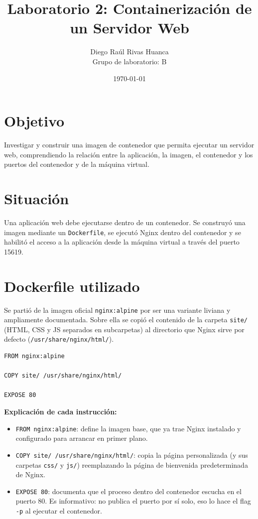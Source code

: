 \documentclass[11pt,a4paper]{article}
\title{Laboratorio 2: Containerización de un Servidor Web}
\author{Diego Raúl Rivas Huanca \\ Grupo de laboratorio: B} \\
\date{\today}
\begin{document}
\maketitle

\section{Objetivo}
Investigar y construir una imagen de contenedor que permita ejecutar un
servidor web, comprendiendo la relación entre la aplicación, la
imagen, el contenedor y los puertos del contenedor y de la máquina
virtual.

\section{Situación}
Una aplicación web debe ejecutarse dentro de un contenedor. Se
construyó una imagen mediante un \texttt{Dockerfile}, se ejecutó Nginx
dentro del contenedor y se habilitó el acceso a la aplicación desde la
máquina virtual a través del puerto 15619.

\section{Dockerfile utilizado}
Se partió de la imagen oficial \texttt{nginx:alpine} por ser una
variante liviana y ampliamente documentada. Sobre ella se copió el
contenido de la carpeta \texttt{site/} (HTML, CSS y JS separados en
subcarpetas) al directorio que Nginx sirve por defecto
(\texttt{/usr/share/nginx/html/}).

\begin{lstlisting}[style=docker,caption={Dockerfile completo},label=lst:dockerfile]
FROM nginx:alpine

COPY site/ /usr/share/nginx/html/

EXPOSE 80
\end{lstlisting}

\textbf{Explicación de cada instrucción:}
\begin{itemize}[leftmargin=1.4cm]
  \item \texttt{FROM nginx:alpine}: define la imagen base, que ya trae
        Nginx instalado y configurado para arrancar en primer plano.
  \item \texttt{COPY site/ /usr/share/nginx/html/}: copia la página
        personalizada (y sus carpetas \texttt{css/} y \texttt{js/})
        reemplazando la página de bienvenida predeterminada de Nginx.
  \item \texttt{EXPOSE 80}: documenta que el proceso dentro del
        contenedor escucha en el puerto 80. Es informativo: no
        publica el puerto por sí solo, eso lo hace el flag
        \texttt{-p} al ejecutar el contenedor.
\end{itemize}
\end{document}
